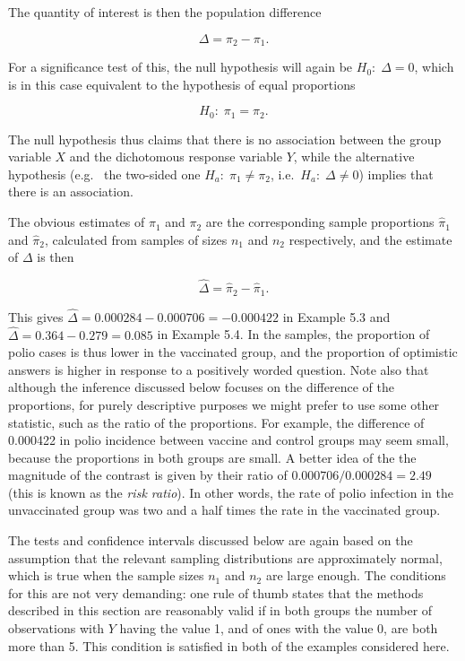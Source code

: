 \documentclass[11pt,a4paper,openany]{book}
\begin{document}
The quantity of interest is then the population difference

\begin{equation}\Delta=\pi_{2}-\pi_{1}.
\label{eq:Dp2sample}\end{equation}

For a significance test of this, the null hypothesis will again be
\(H_{0}:\; \Delta=0\), which is in this case equivalent to the
hypothesis of equal proportions

\begin{equation}H_{0}:\; \pi_{1} = \pi_{2}.
\label{eq:H0pD}\end{equation}

The null hypothesis thus claims that there is no association between the
group variable \(X\) and the dichotomous response variable \(Y\), while
the alternative hypothesis (e.g.~ the two-sided one
\(H_{a}:\; \pi_{1}\ne \pi_{2}\), i.e.~\(H_{a}:\; \Delta\ne 0\)) implies
that there is an association.

The obvious estimates of \(\pi_{1}\) and \(\pi_{2}\) are the
corresponding sample proportions \(\hat{\pi}_{1}\) and
\(\hat{\pi}_{2}\), calculated from samples of sizes \(n_{1}\) and
\(n_{2}\) respectively, and the estimate of \(\Delta\) is then

\begin{equation}\hat{\Delta}=\hat{\pi}_{2} - \hat{\pi}_{1}.
\label{eq:Dhatpi}\end{equation}

This gives \(\hat{\Delta}=0.000284-0.000706=-0.000422\) in Example 5.3
and \(\hat{\Delta}=0.364-0.279=0.085\) in Example 5.4. In the samples,
the proportion of polio cases is thus lower in the vaccinated group, and
the proportion of optimistic answers is higher in response to a
positively worded question. Note also that although the inference
discussed below focuses on the difference of the proportions, for purely
descriptive purposes we might prefer to use some other statistic, such
as the ratio of the proportions. For example, the difference of 0.000422
in polio incidence between vaccine and control groups may seem small,
because the proportions in both groups are small. A better idea of the
the magnitude of the contrast is given by their ratio of
\(0.000706/0.000284=2.49\) (this is known as the \emph{risk ratio}). In
other words, the rate of polio infection in the unvaccinated group was
two and a half times the rate in the vaccinated group.

\label{p2pthumb} The tests and confidence intervals discussed below are
again based on the assumption that the relevant sampling distributions
are approximately normal, which is true when the sample sizes \(n_{1}\)
and \(n_{2}\) are large enough. The conditions for this are not very
demanding: one rule of thumb states that the methods described in this
section are reasonably valid if in both groups the number of
observations with \(Y\) having the value 1, and of ones with the value
0, are both more than 5. This condition is satisfied in both of the
examples considered here.
\end{document}
